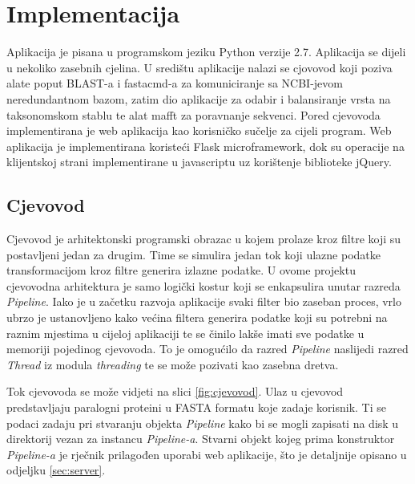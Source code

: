 \chapter{Implementacija}
\label{chap:implementacija}

Aplikacija je pisana u programskom jeziku Python verzije 2.7. Aplikacija se
dijeli u nekoliko zasebnih cjelina. U središtu aplikacije nalazi se cjovovod
koji poziva alate poput BLAST-a i fastacmd-a za komuniciranje sa NCBI-jevom
neredundantnom bazom, zatim dio aplikacije za odabir i balansiranje vrsta na
taksonomskom stablu te alat mafft\cite{mafft} za poravnanje sekvenci.  Pored cjevovoda
implementirana je web aplikacija kao korisničko sučelje za cijeli program. Web
aplikacija je implementirana koristeći Flask microframework, dok su operacije na
klijentskoj strani implementirane u javascriptu uz korištenje biblioteke jQuery.


\section{Cjevovod}
\label{sec:cjevovod}

Cjevovod je arhitektonski programski obrazac u kojem prolaze kroz filtre koji su
postavljeni jedan za drugim. Time se simulira jedan tok koji ulazne podatke
transformacijom kroz filtre generira izlazne podatke. U ovome projektu
cjevovodna arhitektura je samo logički kostur koji se enkapsulira unutar razreda
\emph{Pipeline}. Iako je u začetku razvoja aplikacije svaki filter bio zaseban
proces, vrlo ubrzo je ustanovljeno kako većina filtera generira podatke koji su
potrebni na raznim mjestima u cijeloj aplikaciji te se činilo lakše imati sve
podatke u memoriji pojedinog cjevovoda. To je omogućilo da razred
\emph{Pipeline} naslijedi razred \emph{Thread} iz modula \emph{threading} te se
može pozivati kao zasebna dretva.

Tok cjevovoda se može vidjeti na slici \ref{fig:cjevovod}. Ulaz u cjevovod
predstavljaju paralogni proteini u FASTA formatu koje zadaje korisnik. Ti se
podaci zadaju pri stvaranju objekta \emph{Pipeline} kako bi se mogli zapisati na
disk u direktorij vezan za instancu \emph{Pipeline-a}. Stvarni objekt kojeg
prima konstruktor \emph{Pipeline-a} je rječnik prilagođen uporabi web
aplikacije, što je detaljnije opisano u odjeljku \ref{sec:server}.

